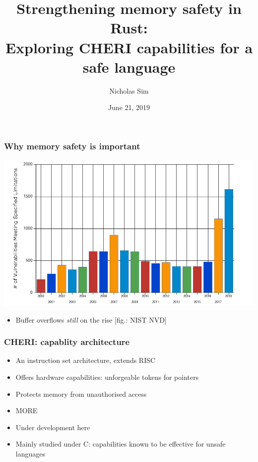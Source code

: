 \documentclass{beamer}
\begin{document}
\title{Strengthening memory safety in Rust:\\
Exploring CHERI capabilities for a safe language}
\author{Nicholas Sim}
\date{June 21, 2019}

\frame{\titlepage}


\begin{frame}
\frametitle{Why memory safety is important}

\includegraphics[width=\textwidth]{graph-overflow.png}
\begin{itemize}
    \item Buffer overflows \emph{still} on the rise [fig.: NIST NVD]
\end{itemize}
\end{frame}


\begin{frame}
\frametitle{CHERI: capablity architecture}

\begin{itemize}
    \item An instruction set architecture, extends RISC
    \item Offers hardware capabilities: unforgeable tokens for pointers
    \item Protects memory from unauthorised access
    \item MORE
    \item Under development here
    \item Mainly studied under C: capabilities known to be effective for
    unsafe languages
\end{itemize}
\end{frame}
\end{document}
